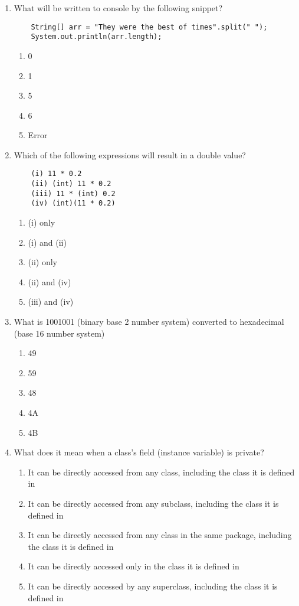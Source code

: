 \documentclass[S17-Final.tex]{subfiles}
\begin{document}
\begin{enumerate}
\item What will be written to console by the following snippet?
\begin{lstlisting}
    String[] arr = "They were the best of times".split(" ");
    System.out.println(arr.length);

\end{lstlisting}
	
\begin{enumerate}
\item 0
\item 1
\item 5
\item 6 \ifdraft \Ans \fi 
\item Error
\end{enumerate}

\item Which of the following expressions will result in a double value?
\begin{lstlisting}
    (i) 11 * 0.2
    (ii) (int) 11 * 0.2
    (iii) 11 * (int) 0.2
    (iv) (int)(11 * 0.2)
\end{lstlisting}
	
\begin{enumerate}
\item  (i) only
\item  (i) and (ii) \ifdraft \Ans \fi 
\item  (ii) only
\item  (ii) and (iv)
\item  (iii) and (iv)
\end{enumerate}

\item What is 1001001 (binary base 2 number system) converted to hexadecimal (base 16 number system)
	
\begin{enumerate}
\item  49 \ifdraft \Ans \fi 
\item  59
\item  48
\item  4A
\item  4B
\end{enumerate}

\item What does it mean when a class's field (instance variable) is private?
	
\begin{enumerate}
\item  It can be directly accessed from any class, including the class it is defined in
\item  It can be directly accessed from any subclass, including the class it is defined in
\item  It can be directly accessed from any class in the same package, including the class it is defined in
\item  It can be directly accessed only in the class it is defined in \ifdraft \Ans \fi 
\item  It can be directly accessed by any superclass, including the class it is defined in
\end{enumerate}
\clearpage


\end{enumerate}
\end{document}
